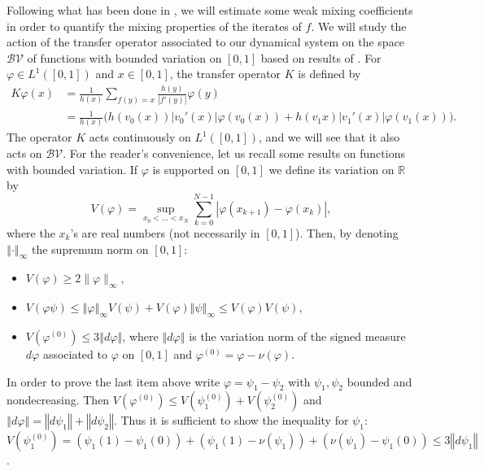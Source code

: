 \documentclass{ws-sd}
\newcommand{\R}{\mathbb{R}}
\newcommand{\norm}[1]{\left\Vert #1\right\Vert}
\newcommand{\abs}[1]{\left\lvert #1 \right\rvert}
\begin{document}
Following what has been done in \cite{7}, we will estimate some weak mixing coefficients in order to quantify the mixing properties of the iterates of $f$. We will study the action of the transfer operator associated to our dynamical system on the space $\mathcal{BV}$ of functions with bounded variation on $[0,1]$ based on results of \cite{15}.
For $\varphi \in L^1([0,1])$  and $x \in [0,1]$, the transfer operator $K$ is defined by
\begin{align*}
  K\varphi(x) &= \frac{1}{h(x)}\sum_{f(y)=x}\frac{h(y)}{\abs{f'(y)}}\varphi(y) \\
  &= \frac{1}{h(x)}\Big( h(v_0(x))\abs{v_0'(x)}\varphi(v_0(x)) + h(v_1x)\abs{v_1'(x)}\varphi(v_1(x)) \Big).
\end{align*}
\newline
The operator $K$ acts continuously on $L^1([0,1])$, and we will see that it also acts on $\mathcal{BV}$.
For the reader's convenience, let us recall some results on functions with bounded variation. If $\varphi$ is supported on $[0,1]$ we define its variation on $\R$ by
$$
    V(\varphi) = \underset{x_0 < \ldots < x_N}{\sup} \sum_{k=0}^{N-1}\abs{\varphi(x_{k+1}) - \varphi(x_k)},
$$
where the $x_k$’s are real numbers (not necessarily in $[0, 1]$). Then, by denoting $\norm{\cdot}_\infty$ the supremum norm on $[0,1]$:
\begin{itemize}
    \item $V(\varphi) \ge 2\lVert \varphi \rVert_{\infty}$,
    \item $V(\varphi \psi) \le \norm{\varphi}_{\infty} V(\psi) + V(\varphi) \norm{\psi}_{\infty}\le V(\varphi)V(\psi)$,
    \item  $V(\varphi^{(0)}) \le 3\norm{d\varphi}$, where $\norm{d\varphi}$ is the variation norm of the signed measure $d\varphi$ associated to $\varphi$ on $[0,1]$ and $\varphi^{(0)} = \varphi - \nu(\varphi)$.
\end{itemize}
In order to prove the last item above write $\varphi = \psi_1 -\psi_2$ with $\psi_1, \psi_2$ bounded and nondecreasing. Then $V(\varphi^{(0)}) \le V(\psi_1^{(0)}) + V(\psi_2^{(0)})$ and $\norm{d\varphi} = \norm{d\psi_1} + \norm{d\psi_2}$. Thus it is sufficient to show the inequality for $\psi_1$:  $V(\psi_1^{(0)}) = (\psi_1(1) - \psi_1(0)) + (\psi_1(1)-\nu(\psi_1)) + (\nu(\psi_1) - \psi_1(0)) \le 3\norm{d\psi_1}$.
\\
\end{document}
